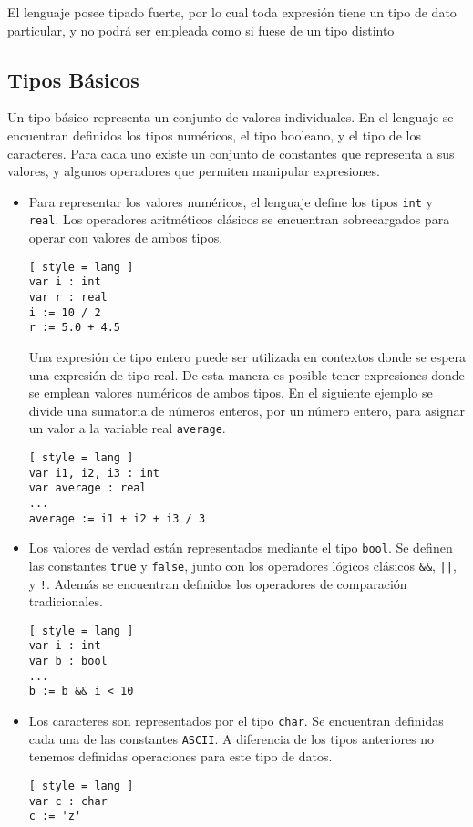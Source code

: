 El lenguaje posee tipado fuerte, por lo cual toda expresión tiene un tipo de dato particular, y
no podrá ser empleada como si fuese de un tipo distinto
\fi

\subsection{Tipos Básicos}

Un tipo básico representa un conjunto de valores individuales.
En el lenguaje se encuentran definidos los tipos numéricos, el tipo booleano, y el tipo de los caracteres.
Para cada uno existe un conjunto de constantes que representa a sus valores, y algunos operadores que permiten manipular expresiones.
\begin{itemize}
\item
Para representar los valores numéricos, el lenguaje define los tipos \lstinline[style = lang]{int} y \lstinline[style = lang]{real}. 
Los operadores aritméticos clásicos se encuentran sobrecargados para operar con valores de ambos tipos.
\begin{lstlisting}[ style = lang ]
var i : int
var r : real
i := 10 / 2
r := 5.0 + 4.5
\end{lstlisting}
Una expresión de tipo entero puede ser utilizada en contextos donde se espera una expresión de tipo real.
De esta manera es posible tener expresiones donde se emplean valores numéricos de ambos tipos.
En el siguiente ejemplo se divide una sumatoria de números enteros, por un número entero, para asignar un valor a la variable real \lstinline[style = lang]{average}.
\begin{lstlisting}[ style = lang ]
var i1, i2, i3 : int
var average : real
...
average := i1 + i2 + i3 / 3
\end{lstlisting}
\item
Los valores de verdad están representados mediante el tipo \lstinline[style = lang]{bool}.
Se definen las constantes \lstinline[style = lang]{true} y \lstinline[style = lang]{false}, junto con los operadores lógicos clásicos \lstinline[style = lang]{&&}, \lstinline[style = lang]{||}, y \lstinline[style = lang]{!}.
Además se encuentran definidos los operadores de comparación tradicionales.
\begin{lstlisting}[ style = lang ]
var i : int
var b : bool
...
b := b && i < 10
\end{lstlisting}
\item
Los caracteres son representados por el tipo \lstinline[style = lang]{char}.
Se encuentran definidas cada una de las constantes \texttt{ASCII}.
A diferencia de los tipos anteriores no tenemos definidas operaciones para este tipo de datos.
\begin{lstlisting}[ style = lang ]
var c : char
c := 'z'
\end{lstlisting}
\end{itemize}


